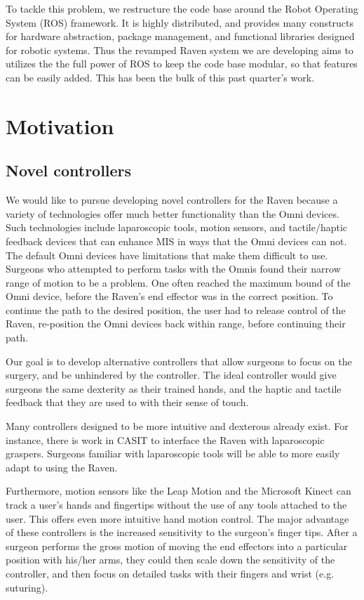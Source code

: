 \documentclass[letterpaper,twocolumn,10pt]{article}
\begin{document}
To tackle this problem, we restructure the code base around the Robot
Operating System (ROS) framework. It is highly distributed, and 
provides many constructs for hardware abstraction, package management, 
and functional libraries designed for robotic systems. Thus the 
revamped Raven system we are developing aims to utilizes the the full 
power  of ROS to keep the code base modular, so that features can be 
easily added. This has been the bulk of this past quarter's work.

\section{Motivation}

\subsection{Novel controllers}
We would like to pursue developing novel controllers for the Raven
because a variety of technologies offer much better functionality than
the Omni devices. Such technologies include laparoscopic tools, motion
sensors, and tactile/haptic feedback devices that can enhance MIS in
ways that the Omni devices can not.  The default Omni devices have
limitations that make them difficult to use. Surgeons who attempted to
perform tasks with the Omnis found their narrow range of motion to be
a problem. One often reached the maximum bound of the Omni device,
before the Raven's end effector was in the correct position. To
continue the path to the desired position, the user had to release
control of the Raven, re-position the Omni devices back within range,
before continuing their path.

Our goal is to develop alternative controllers that allow surgeons to
focus on the surgery, and be unhindered by the controller. The ideal
controller would give surgeons the same dexterity as their trained
hands, and the haptic and tactile feedback that they are used to with
their sense of touch.

Many controllers designed to be more intuitive and dexterous already
exist. For instance, there is work in CASIT to interface the Raven
with laparoscopic graspers. Surgeons familiar with laparoscopic tools
will be able to more easily adapt to using the Raven.

Furthermore, motion sensors like the Leap Motion and the Microsoft
Kinect can track a user's hands and fingertips without the use of any
tools attached to the user. This offers even more intuitive hand
motion control. The major advantage of these controllers is the
increased sensitivity to the surgeon's finger tips. After a surgeon
performs the gross motion of moving the end effectors into a
particular position with his/her arms, they could then scale down the
sensitivity of the controller, and then focus on detailed tasks with
their fingers and wrist (e.g. suturing).
\end{document}

